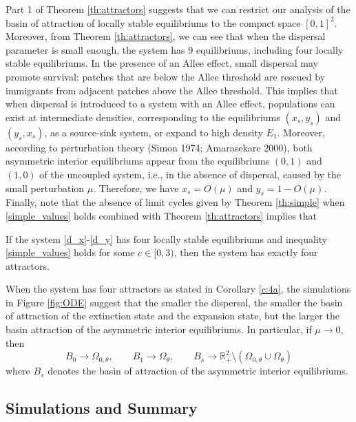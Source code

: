 \noindent Part 1 of Theorem \ref{th:attractors} suggests that we can restrict our analysis of the basin of attraction of locally
 stable equilibriums to the compact space $[0,1]^2$.
 Moreover, from Theorem \ref{th:attractors}, we can see that when the dispersal parameter is small enough, the system has 9
 equilibriums, including four locally stable equilibriums.
 In the presence of an Allee effect, small dispersal may promote survival:
 patches that are below the Allee threshold are rescued by immigrants from adjacent patches above the Allee threshold.
 This implies that when dispersal is introduced to a system with an Allee effect, populations can exist at intermediate densities,
 corresponding to the equilibriums $(x_s, y_s)$ and $(y_s, x_s)$, as a source-sink system, or expand to high density $E_1$.
 Moreover, according to perturbation theory (Simon 1974; Amarasekare 2000), both asymmetric interior equilibriums appear
 from the equilibriums $(0, 1)$ and $(1, 0)$ of the uncoupled system, i.e., in the absence of dispersal, caused by the small
 perturbation $\mu$.
 Therefore, we have $x_s = O (\mu)$ and $y_s = 1 - O (\mu)$.
 Finally, note that the absence of limit cycles given by Theorem \ref{th:simple} when \eqref{simple_values} holds combined
 with Theorem \ref{th:attractors} implies that
\begin{corollary}
\label{c:4a}
 If the system \eqref{d_x}-\eqref{d_y} has four locally stable equilibriums and inequality \eqref{simple_values} holds for some
 $c \in [0, 3)$, then the system has exactly four attractors.
\end{corollary}
\noindent When the system has four attractors as stated in Corollary \ref{c:4a}, the simulations in Figure \ref{fig:ODE} suggest
 that the smaller the dispersal, the smaller the basin of attraction of the extinction state and the expansion state, but the
 larger the basin attraction of the asymmetric interior equilibriums.
 In particular, if $\mu \rightarrow 0$, then
 $$ B_0 \rightarrow \Omega_{0,\theta}, \qquad B_1 \rightarrow \Omega_\theta, \qquad
    B_s \rightarrow {{\mathbb{R}}}^2_+ \setminus (\Omega_{0, \theta} \cup \Omega_\theta) $$
 where $B_s$ denotes the basin of attraction of the asymmetric interior equilibriums.

\subsection{ Simulations and Summary}

